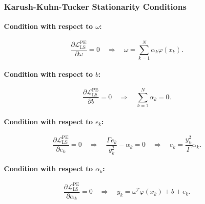 \documentclass[mathematics,article,submit,pdftex,moreauthors]{Definitions/mdpi}
\begin{document}
\subsubsection{Karush-Kuhn-Tucker Stationarity Conditions}

\paragraph{Condition with respect to $\omega$:}
\begin{linenomath}
\begin{equation}\label{eq:kkt_ls_omega_app}
\frac{\partial\mathcal{L}_{\mathrm{LS}}^{\mathrm{PE}}}{\partial\omega} = 0 
\quad \Rightarrow \quad 
\omega = \sum_{k=1}^N \alpha_k\varphi(x_k).
\end{equation}
\end{linenomath}

\paragraph{Condition with respect to $b$:}
\begin{linenomath}
\begin{equation}\label{eq:kkt_ls_b_app}
\frac{\partial\mathcal{L}_{\mathrm{LS}}^{\mathrm{PE}}}{\partial b} = 0 
\quad \Rightarrow \quad 
\sum_{k=1}^N \alpha_k = 0.
\end{equation}
\end{linenomath}

\paragraph{Condition with respect to $e_k$:}
\begin{linenomath}
\begin{equation}\label{eq:kkt_ls_ek_app}
\frac{\partial\mathcal{L}_{\mathrm{LS}}^{\mathrm{PE}}}{\partial e_k} = 0 
\quad \Rightarrow \quad 
\frac{\Gamma e_k}{y_k^2} - \alpha_k = 0
\quad \Rightarrow \quad 
e_k = \frac{y_k^2}{\Gamma}\alpha_k.
\end{equation}
\end{linenomath}

\paragraph{Condition with respect to $\alpha_k$:}
\begin{linenomath}
\begin{equation}\label{eq:kkt_ls_alpha_app}
\frac{\partial\mathcal{L}_{\mathrm{LS}}^{\mathrm{PE}}}{\partial\alpha_k} = 0 
\quad \Rightarrow \quad 
y_k = \omega^T\varphi(x_k) + b + e_k.
\end{equation}
\end{linenomath}
\end{document}
